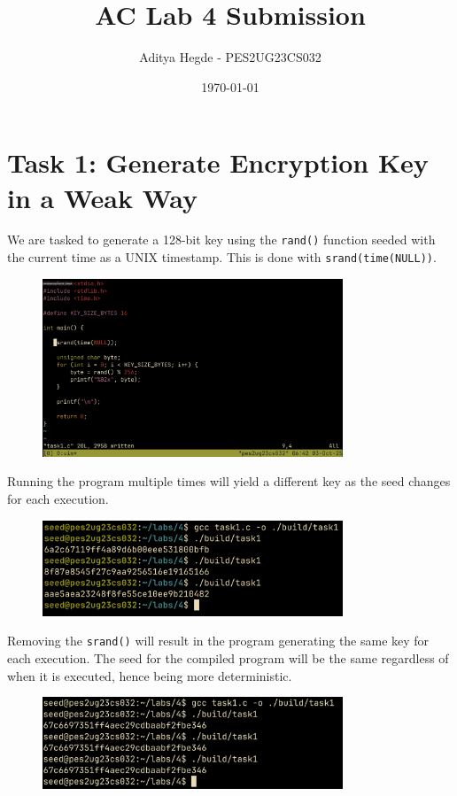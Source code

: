 \documentclass[12pt,a4paper]{article}
\title{AC Lab 4 Submission}
\author{Aditya Hegde \@- PES2UG23CS032}
\date{\today}
\begin{document}
\maketitle

\section{Task 1: Generate Encryption Key in a Weak Way}

We are tasked to generate a 128-bit key using the \texttt{rand()} function seeded with the current time as a UNIX timestamp. This is done with \texttt{srand(time(NULL))}.

\begin{figure}[H]
    \centering
    \includegraphics[width=0.8\textwidth]{./images/task1-1.png} 
\end{figure}

Running the program multiple times will yield a different key as the seed changes for each execution.

\begin{figure}[H]
    \centering
    \includegraphics[width=0.8\textwidth]{./images/task1-2.png} 
\end{figure}

Removing the \texttt{srand()} will result in the program generating the same key for each execution. The seed for the compiled program will be the same regardless of when it is executed, hence being more deterministic.

\begin{figure}[H]
    \centering
    \includegraphics[width=0.8\textwidth]{./images/task1-3.png} 
\end{figure}
\end{document}
